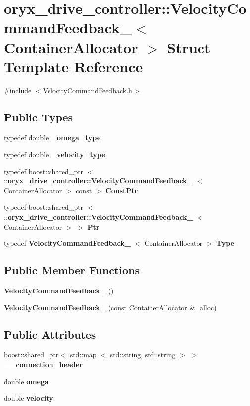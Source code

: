 \section{oryx\-\_\-drive\-\_\-controller\-:\-:\-Velocity\-Command\-Feedback\-\_\-$<$ \-Container\-Allocator $>$ \-Struct \-Template \-Reference}
\label{structoryx__drive__controller_1_1VelocityCommandFeedback__}


{\ttfamily \#include $<$\-Velocity\-Command\-Feedback.\-h$>$}

\subsection*{\-Public \-Types}
\begin{DoxyCompactItemize}
\item 
typedef double {\bf \-\_\-omega\-\_\-type}
\item 
typedef double {\bf \-\_\-velocity\-\_\-type}
\item 
typedef boost\-::shared\-\_\-ptr\*
$<$ \-::{\bf oryx\-\_\-drive\-\_\-controller\-::\-Velocity\-Command\-Feedback\-\_\-}\*
$<$ \-Container\-Allocator $>$ const  $>$ {\bf \-Const\-Ptr}
\item 
typedef boost\-::shared\-\_\-ptr\*
$<$ \-::{\bf oryx\-\_\-drive\-\_\-controller\-::\-Velocity\-Command\-Feedback\-\_\-}\*
$<$ \-Container\-Allocator $>$ $>$ {\bf \-Ptr}
\item 
typedef \*
{\bf \-Velocity\-Command\-Feedback\-\_\-}\*
$<$ \-Container\-Allocator $>$ {\bf \-Type}
\end{DoxyCompactItemize}
\subsection*{\-Public \-Member \-Functions}
\begin{DoxyCompactItemize}
\item 
{\bf \-Velocity\-Command\-Feedback\-\_\-} ()
\item 
{\bf \-Velocity\-Command\-Feedback\-\_\-} (const \-Container\-Allocator \&\-\_\-alloc)
\end{DoxyCompactItemize}
\subsection*{\-Public \-Attributes}
\begin{DoxyCompactItemize}
\item 
boost\-::shared\-\_\-ptr$<$ std\-::map\*
$<$ std\-::string, std\-::string $>$ $>$ {\bf \-\_\-\-\_\-connection\-\_\-header}
\item 
double {\bf omega}
\item 
double {\bf velocity}
\end{DoxyCompactItemize}



